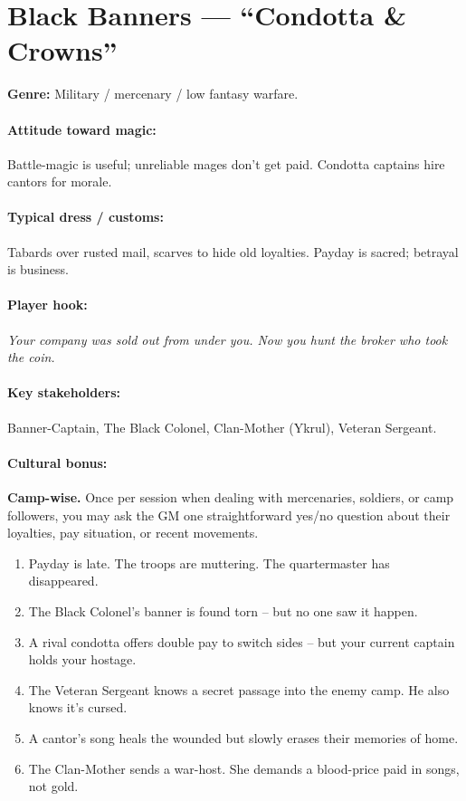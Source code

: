 \section{Black Banners --- ``Condotta \& Crowns''}
\textbf{Genre:} Military / mercenary / low fantasy warfare.

\paragraph{Attitude toward magic:} Battle-magic is useful; unreliable mages don't get paid. Condotta captains hire cantors for morale.

\paragraph{Typical dress / customs:} Tabards over rusted mail, scarves to hide old loyalties. Payday is sacred; betrayal is business.

\paragraph{Player hook:} \emph{Your company was sold out from under you. Now you hunt the broker who took the coin.}

\paragraph{Key stakeholders:} Banner-Captain, The Black Colonel, Clan-Mother (Ykrul), Veteran Sergeant.

\paragraph{Cultural bonus:} \textbf{Camp-wise.} Once per session when dealing with mercenaries, soldiers, or camp followers, you may ask the GM one straightforward yes/no question about their loyalties, pay situation, or recent movements.

\begin{tcolorbox}[colback=gray!5!white, colframe=gray!70!black, title=Black Banners Mini-Generator (d6),breakable]
\begin{enumerate}
\item Payday is late. The troops are muttering. The quartermaster has disappeared.
\item The Black Colonel's banner is found torn -- but no one saw it happen.
\item A rival condotta offers double pay to switch sides -- but your current captain holds your hostage.
\item The Veteran Sergeant knows a secret passage into the enemy camp. He also knows it's cursed.
\item A cantor's song heals the wounded but slowly erases their memories of home.
\item The Clan-Mother sends a war-host. She demands a blood-price paid in songs, not gold.
\end{enumerate}
\end{tcolorbox}

